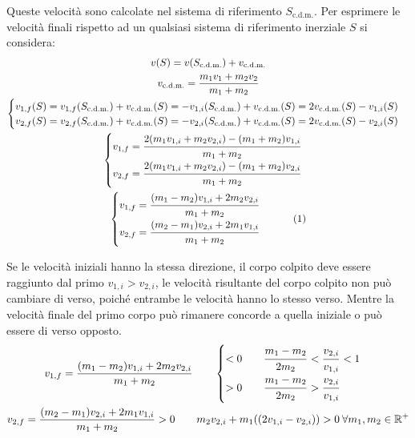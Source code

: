 \documentclass{article}
\numberwithin{equation}{subsection}
\begin{document}
Queste velocità sono calcolate nel sistema di riferimento $S_{\mathrm{c.d.m.}}$. Per esprimere le velocità finali rispetto ad un qualsiasi sistema di riferimento inerziale 
$S$ si considera: 
\begin{gather*}
    v(S)=v(S_{\mathrm{c.d.m.}})+v_{\mathrm{c.d.m.}}\\
    v_{\mathrm{c.d.m.}}=\displaystyle\frac{m_1v_1+m_2v_2}{m_1+m_2}\\
    \begin{cases}
        v_{1,f}(S)=v_{1,f}(S_{\mathrm{c.d.m.}})+v_{\mathrm{c.d.m.}}(S)=-v_{1,i}(S_{\mathrm{c.d.m.}})+v_{\mathrm{c.d.m.}}(S)=2v_{\mathrm{c.d.m.}}(S)-v_{1,i}(S)\\
        v_{2,f}(S)=v_{2,f}(S_{\mathrm{c.d.m.}})+v_{\mathrm{c.d.m.}}(S)=-v_{2,i}(S_{\mathrm{c.d.m.}})+v_{\mathrm{c.d.m.}}(S)=2v_{\mathrm{c.d.m.}}(S)-v_{2,i}(S)
    \end{cases}\\
    \begin{cases}
        v_{1,f}=\displaystyle\frac{\strut2(m_1v_{1,i}+m_2v_{2,i})-(m_1+m_2)v_{1,i}}{\strut m_1+m_2}\\
        v_{2,f}=\displaystyle\frac{\strut2(m_1v_{1,i}+m_2v_{2,i})-(m_1+m_2)v_{2,i}}{\strut m_1+m_2}
    \end{cases}\\
    \begin{cases}
        v_{1,f}=\displaystyle\frac{\strut (m_1-m_2)v_{1,i}+2m_2v_{2,i}}{\strut m_1+m_2}\\
        v_{2,f}=\displaystyle\frac{(\strut m_2-m_1)v_{2,i}+2m_1v_{1,i}}{\strut m_1+m_2}
    \end{cases}\tag{\stepcounter{equation}\theequation}
\end{gather*}


Se le velocità iniziali hanno la stessa direzione, il 
corpo colpito deve essere raggiunto dal primo $v_{1,i}>v_{2,i}$, 
le velocità risultante del corpo colpito non può cambiare di 
verso, poiché entrambe le velocità hanno lo stesso verso. Mentre 
la velocità finale del primo corpo può rimanere concorde a 
quella iniziale o può essere di verso opposto.
\begin{gather*}
    \displaystyle v_{1,f}=\frac{(m_1-m_2)v_{1,i}+2m_2v_{2,i}}{m_1+m_2}\qquad
    \begin{cases}
        <0\qquad\displaystyle\frac{\strut m_1-m_2}{\strut 2m_2}<\frac{\strut v_{2,i}}{\strut v_{1,i}}<1\\
        >0\qquad\displaystyle\frac{\strut m_1-m_2}{\strut 2m_2}>\frac{\strut v_{2,i}}{\strut v_{1,i}}
    \end{cases}\\
    \displaystyle v_{2,f}=\frac{(m_2-m_1)v_{2,i}+2m_1v_{1,i}}{m_1+m_2}>0 \qquad m_2v_{2,i}+m_1((2v_{1,i}-v_{2,i}))>0\:\forall m_1,m_2\in\mathbb{R}^+
\end{gather*}
\end{document}
